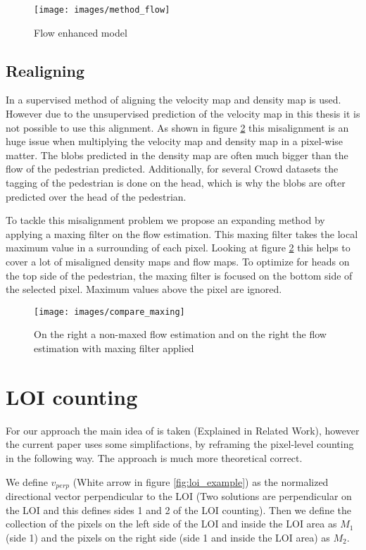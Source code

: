 \begin{figure}[h]
\centering
\texttt{[image: images/method\_flow]}
\caption{Flow enhanced model}
\label{fig:unified_model}
\end{figure}


\subsection{Realigning}
In \cite{leibe_crossing-line_2016} a supervised method of aligning the velocity map and density map is used. However due to the unsupervised prediction of the velocity map in this thesis it is not possible to use this alignment. As shown in figure \ref{fig:maxing} this misalignment is an huge issue when multiplying the velocity map and density map in a pixel-wise matter. The blobs predicted in the density map are often much bigger than the flow of the pedestrian predicted. Additionally, for several Crowd datasets the tagging of the pedestrian is done on the head, which is why the blobs are ofter predicted over the head of the pedestrian.

To tackle this misalignment problem we propose an expanding method by applying a maxing filter on the flow estimation. This maxing filter takes the local maximum value in a surrounding of each pixel. Looking at figure \ref{fig:maxing} this helps to cover a lot of misaligned density maps and flow maps. To optimize for heads on the top side of the pedestrian, the maxing filter is focused on the bottom side of the selected pixel. Maximum values above the pixel are ignored.

\begin{figure}[h]
\centering
\texttt{[image: images/compare\_maxing]}
\caption{On the right a non-maxed flow estimation and on the right the flow estimation with maxing filter applied}
\label{fig:maxing}
\end{figure}


\section{LOI counting}
For our approach the main idea of \cite{leibe_crossing-line_2016} is taken (Explained in Related Work), however the current paper uses some simplifactions, by reframing the pixel-level counting in the following way. The approach is much more theoretical correct.

\label{sec:pixel_level}
We define $v_{perp}$ (White arrow in figure \ref{fig:loi_example}) as the normalized directional vector perpendicular to the LOI (Two solutions are perpendicular on the LOI and this defines sides 1 and 2 of the LOI counting). Then we define the collection of the pixels on the left side of the LOI and inside the LOI area as $M_1$ (side 1) and the pixels on the right side (side 1 and inside the LOI area) as $M_2$.

